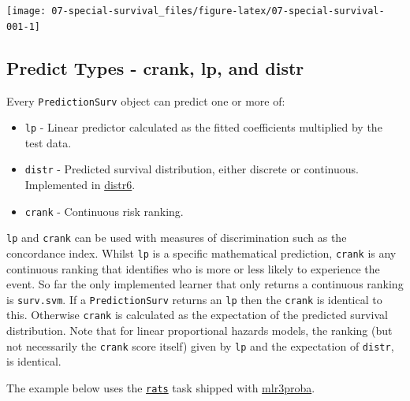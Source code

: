 \documentclass[
]{scrbook}
\providecommand{\tightlist}{%
  \setlength{\itemsep}{0pt}\setlength{\parskip}{0pt}}
\begin{document}
\begin{center}\texttt{[image: 07-special-survival\_files/figure-latex/07-special-survival-001-1]} \end{center}

\hypertarget{predict-types---crank-lp-and-distr}{%
\subsection{Predict Types - crank, lp, and distr}\label{predict-types---crank-lp-and-distr}}

Every \texttt{PredictionSurv} object can predict one or more of:

\begin{itemize}
\tightlist
\item
  \texttt{lp} - Linear predictor calculated as the fitted coefficients multiplied by the test data.
\item
  \texttt{distr} - Predicted survival distribution, either discrete or continuous. Implemented in \href{https://cran.r-project.org/package=distr6}{distr6}.
\item
  \texttt{crank} - Continuous risk ranking.
\end{itemize}

\texttt{lp} and \texttt{crank} can be used with measures of discrimination such as the concordance index.
Whilst \texttt{lp} is a specific mathematical prediction, \texttt{crank} is any continuous ranking that identifies who is more or less likely to experience the event.
So far the only implemented learner that only returns a continuous ranking is \texttt{surv.svm}.
If a \texttt{PredictionSurv} returns an \texttt{lp} then the \texttt{crank} is identical to this.
Otherwise \texttt{crank} is calculated as the expectation of the predicted survival distribution.
Note that for linear proportional hazards models, the ranking (but not necessarily the \texttt{crank} score itself) given by \texttt{lp} and the expectation of \texttt{distr}, is identical.

The example below uses the \href{https://mlr3proba.mlr-org.com/reference/mlr_tasks_rats.html}{\texttt{rats}} task shipped with \href{https://mlr3proba.mlr-org.com}{mlr3proba}.
\end{document}
